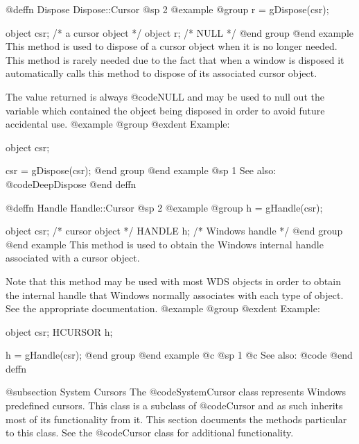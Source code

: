 @deffn {Dispose} Dispose::Cursor
@sp 2
@example
@group
r = gDispose(csr);

object  csr;   /*  a cursor object    */
object  r;     /*  NULL               */
@end group
@end example
This method is used to dispose of a cursor object when it
is no longer needed.  This method is rarely needed due to the fact that
when a window is disposed it automatically calls this method to
dispose of its associated cursor object.

The value returned is always @code{NULL} and may be used to null out
the variable which contained the object being disposed in order to
avoid future accidental use.
@example
@group
@exdent Example:

object  csr;

csr = gDispose(csr);
@end group
@end example
@sp 1
See also:  @code{DeepDispose}
@end deffn










@deffn {Handle} Handle::Cursor
@sp 2
@example
@group
h = gHandle(csr);

object  csr;    /*  cursor object   */
HANDLE  h;      /*  Windows handle  */
@end group
@end example
This method is used to obtain the Windows internal handle associated with
a cursor object.  

Note that this method may be used with most WDS objects in order to obtain
the internal handle that Windows normally associates with each type of object.
See the appropriate documentation.
@example
@group
@exdent Example:

object  csr;
HCURSOR h;

h = gHandle(csr);
@end group
@end example
@c @sp 1
@c See also:  @code{}
@end deffn









@subsection System Cursors
The @code{SystemCursor} class represents Windows predefined cursors.
This class is a subclass of @code{Cursor} and as such inherits most
of its functionality from it.  This section documents the methods
particular to this class.  See the @code{Cursor} class for additional
functionality.











